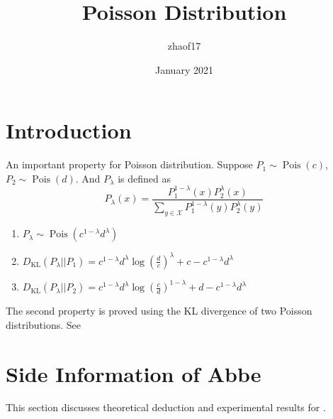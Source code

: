 \documentclass{article}
\title{Poisson Distribution}
\author{zhaof17 }
\date{January 2021}
\DeclareMathOperator{\Pois}{Pois}
\begin{document}
\maketitle

\section{Introduction}
An important property for Poisson distribution.
Suppose $P_1 \sim \Pois(c)$, $P_2 \sim \Pois(d)$.
And $P_{\lambda}$ is defined as 
\begin{equation}\label{eq:P_lambda}
    P_{\lambda}(x) = \frac{P_1^{1-\lambda}(x) P_2^{\lambda} (x)}
    {\sum_{y \in \mathcal{X}}
    P_1^{1-\lambda}(y)
    P_2^{\lambda} (y)
    }    
\end{equation}

\begin{enumerate}
    \item $P_{\lambda} \sim \Pois(c^{1-\lambda} d^{\lambda})$
    \item $D_{\mathrm{KL}}(P_{\lambda}||P_1) = c^{1-\lambda}d^{\lambda}\log(\frac{d}{c})^{\lambda} + c-c^{1-\lambda}d^{\lambda}$
    \item $D_{\mathrm{KL}}(P_{\lambda}||P_2) = c^{1-\lambda}d^{\lambda}\log(\frac{c}{d})^{1-\lambda} + d-c^{1-\lambda}d^{\lambda}$
\end{enumerate}
The second property is proved using the KL divergence
of two Poisson distributions. See \cite{kl}
\section{Side Information of Abbe}
This section discusses theoretical deduction and experimental results for \cite{abbe}.
\end{document}
